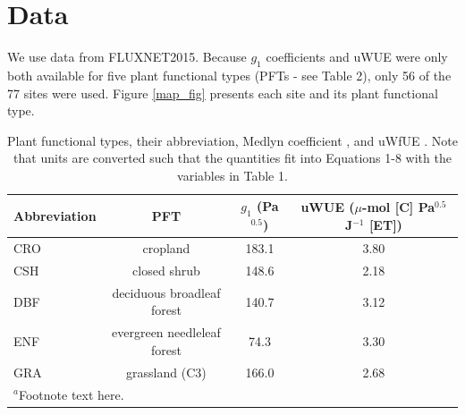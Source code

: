 \documentclass[draft,linenumbers]{agujournal}
\begin{document}
\section{Data}

We use data from FLUXNET2015. Because $g_1$ coefficients \citep{Lin_2015} and uWUE were only both available for five plant functional types (PFTs - see Table 2),  only 56 of the 77 sites were used. Figure \ref{map_fig}  presents each site and its plant functional type.


\begin{table}
\caption{Plant functional types, their abbreviation, Medlyn coefficient \citep[from ][]{Lin_2015}, and uWfUE \citep[from ][]{Zhou_2015}. Note that units are converted such that the quantities fit into Equations 1-8 with the variables in Table 1.}
\centering
\begin{tabular}{l c c c}
  \hline
  Abbreviation & PFT & $g_1$ (Pa$^{0.5}$) & uWUE ($\mu$-mol [C] Pa$^{0.5}$ J$^{-1}$ [ET])  \\
  \hline
  CRO & cropland & 183.1 & 3.80 \\
  CSH & closed shrub & 148.6 & 2.18 \\
  DBF & deciduous broadleaf forest & 140.7 & 3.12 \\
  ENF & evergreen needleleaf forest & 74.3 & 3.30 \\
  GRA & grassland (C3) & 166.0 & 2.68 \\
\hline
\multicolumn{2}{l}{$^{a}$Footnote text here.}
\end{tabular}
\end{table}
\end{document}
